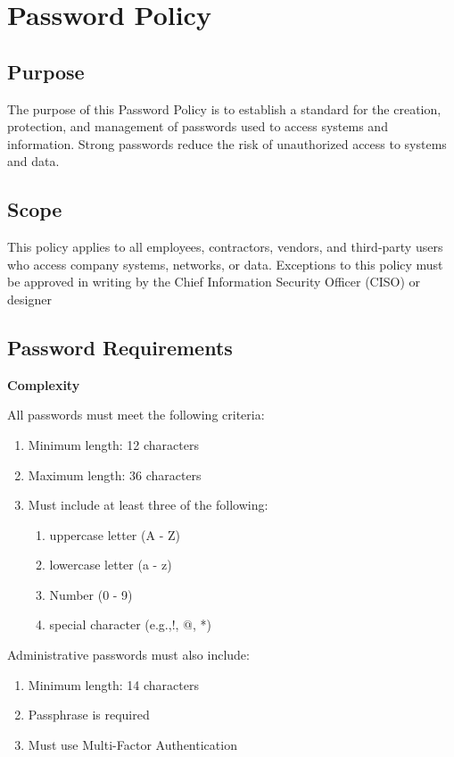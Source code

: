 \chapter{Password Policy}
\pagestyle{fancy}

\fancyhf{}

\fancyfoot[C]{\thepage}

\renewcommand{\headrulewidth}{0pt}
\renewcommand{\footrulewidth}{0pt}

\section{Purpose}
The purpose of this Password Policy is to establish a standard for the creation, protection, and management of passwords used to access systems and information. Strong passwords reduce the risk of unauthorized access to systems and data.
\section{Scope}
This policy applies to all employees, contractors, vendors, and third-party users who access company systems, networks, or data. Exceptions to this policy must be approved in writing by the Chief Information Security Officer (CISO) or designer
\section{Password Requirements}
\textbf{Complexity}

All passwords must meet the following criteria:
\begin{enumerate}
    \item Minimum length: 12 characters
    \item Maximum length: 36 characters
    \item Must include at least three of the following:
    \begin{enumerate}
        \item uppercase letter (A - Z)
        \item lowercase letter (a - z)
        \item Number (0 - 9)
        \item special character (e.g.,!, @, *)
    \end{enumerate}    
\end{enumerate}
    Administrative passwords must also include:
\begin{enumerate}
    \item Minimum length: 14 characters
    \item Passphrase is required 
    \item Must use Multi-Factor Authentication
\end{enumerate}
    
